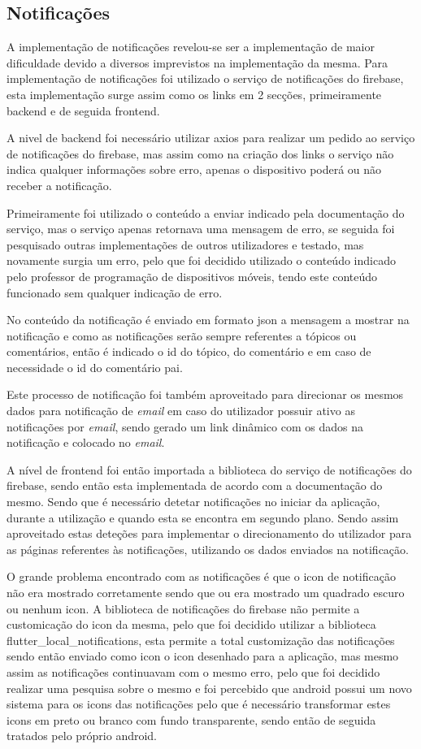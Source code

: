 \subsection{Notificações}

A implementação de notificações revelou-se ser a implementação de maior dificuldade devido a diversos imprevistos na implementação da mesma. Para implementação de notificações foi utilizado o serviço de notificações do firebase, esta implementação surge assim como os links em 2 secções, primeiramente backend e de seguida frontend.

A nivel de backend foi necessário utilizar axios para realizar um pedido ao serviço de notificações do firebase, mas assim como na criação dos links o serviço não indica qualquer informações sobre erro, apenas o dispositivo poderá ou não receber a notificação. 

Primeiramente foi utilizado o conteúdo a enviar indicado pela documentação do serviço, mas o serviço apenas retornava uma mensagem de erro, se seguida foi pesquisado outras implementações de outros utilizadores e testado, mas novamente surgia um erro, pelo que foi decidido utilizado o conteúdo indicado pelo professor de programação de dispositivos móveis, tendo este conteúdo funcionado sem qualquer indicação de erro. 

No conteúdo da notificação é enviado em formato json a mensagem a mostrar na notificação e como as notificações serão sempre referentes a tópicos ou comentários, então é indicado o id do tópico, do comentário e em caso de necessidade o id do comentário pai.

Este processo de notificação foi também aproveitado para direcionar os mesmos dados para notificação de \textit{email} em caso do utilizador possuir ativo as notificações por \textit{email}, sendo gerado um link dinâmico com os dados na notificação e colocado no \textit{email}.

A nível de frontend foi então importada a biblioteca do serviço de notificações do firebase, sendo então esta implementada de acordo com a documentação do mesmo. Sendo que é necessário detetar notificações no iniciar da aplicação, durante a utilização e quando esta se encontra em segundo plano. Sendo assim aproveitado estas deteções para implementar o direcionamento do utilizador para as páginas referentes às notificações, utilizando os dados enviados na notificação.

O grande problema encontrado com as notificações é que o icon de notificação não era mostrado corretamente sendo que ou era mostrado um quadrado escuro ou nenhum icon. A biblioteca de notificações do firebase não permite a customicação do icon da mesma, pelo que foi decidido utilizar a biblioteca flutter\_local\_notifications, esta permite a total customização das notificações sendo então enviado como icon o icon desenhado para a aplicação, mas mesmo assim as notificações continuavam com o mesmo erro, pelo que foi decidido realizar uma pesquisa sobre o mesmo e foi percebido que android possui um novo sistema para os icons das notificações pelo que é necessário transformar estes icons em preto ou branco com fundo transparente, sendo então de seguida tratados pelo próprio android.

